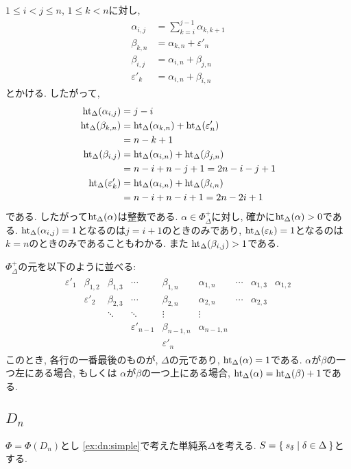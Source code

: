 $1\leq i<j\leq n$, $1\leq k <n$に対し,
\begin{align*}
\alpha_{i,j}&=\sum_{k=i}^{j-1}\alpha_{k,k+1}\\
\beta_{k,n}&=\alpha_{k,n}+\varepsilon'_{n}\\
\beta_{i,j}&=\alpha_{i,n}+\beta_{j,n}\\
\varepsilon'_{k}&=\alpha_{i,n}+\beta_{i,n}
\end{align*}
とかける.
したがって,
\begin{align*}
\operatorname{ht}_\Delta(\alpha_{i,j})&=j-i\\
\operatorname{ht}_\Delta(\beta_{k,n})&=\operatorname{ht}_\Delta(\alpha_{k,n})+\operatorname{ht}_\Delta(\varepsilon'_{n})\\
&=n-k+1\\
\operatorname{ht}_\Delta(\beta_{i,j})&=\operatorname{ht}_\Delta(\alpha_{i,n})+\operatorname{ht}_\Delta(\beta_{j,n})\\
&=n-i+n-j+1=2n-i-j+1\\
\operatorname{ht}_\Delta(\varepsilon'_{k})&=\operatorname{ht}_\Delta(\alpha_{i,n})+\operatorname{ht}_\Delta(\beta_{i,n})\\
&=n-i+n-i+1=2n-2i+1
\end{align*}
である.
したがって$\operatorname{ht}_\Delta(\alpha)$は整数である.
$\alpha\in\Phi_\Delta^+$に対し, 確かに$\operatorname{ht}_{\Delta}(\alpha)>0$である.
$\operatorname{ht}_\Delta(\alpha_{i,j})=1$となるのは$j=i+1$のときのみであり,
$\operatorname{ht}_\Delta(\varepsilon_{k})=1$となるのは$k=n$のときのみであることもわかる.
また
$\operatorname{ht}_\Delta(\beta_{i,j})>1$である.

$\Phi_\Delta^+$の元を以下のように並べる:
\begin{align*}
  \begin{array}{ccccccccc}
    \varepsilon'_{1}&\beta_{1,2}&\beta_{1,3}&\cdots&\beta_{1,n}&
    \alpha_{1,n}&\cdots&\alpha_{1,3}&\alpha_{1,2}\\
    &\varepsilon'_{2}&\beta_{2,3}&\cdots&\beta_{2,n}&
    \alpha_{2,n}&\cdots&\alpha_{2,3}\\
    &&\ddots&\ddots&
    \vdots      &\vdots&&\\
    &&&\varepsilon'_{n-1}&\beta_{n-1,n}&\alpha_{n-1,n}\\
    &&&&\varepsilon'_{n}
  \end{array}
\end{align*}
このとき, 各行の一番最後のものが, $\Delta$の元であり,
$\operatorname{ht}_\Delta(\alpha)=1$である.
$\alpha$が$\beta$の一つ左にある場合,
もしくは
$\alpha$が$\beta$の一つ上にある場合,
$\operatorname{ht}_\Delta(\alpha)=\operatorname{ht}_\Delta(\beta)+1$である.

\subsection{$D_{n}$}
$\Phi=\Phi(D_n)$とし
\cref{ex:dn:simple}で考えた単純系$\Delta$を考える.
$S=\Set{s_\delta|\delta\in \Delta}$とする.

